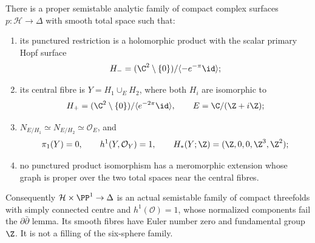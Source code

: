 \begin{proposition}\label{push:src:B.4.7}
There is a proper semistable analytic family of compact complex
surfaces $p:\mathcal H\to\Delta$ with smooth total space such that:
\begin{enumerate}
\item its punctured restriction is a holomorphic product with the
scalar primary Hopf surface
\[
 H_-=(\C^2\setminus\{0\})/\langle -e^{-\pi}\id\rangle;
\]
\item its central fibre is $Y=H_1\cup_E H_2$, where both $H_i$
are isomorphic to
\[
 H_+=(\C^2\setminus\{0\})/\langle e^{-2\pi}\id\rangle,
 \qquad E=\C/(\Z+i\Z);
\]
\item $N_{E/H_1}\simeq N_{E/H_2}\simeq\mathcal O_E$, and
\[
 \pi_1(Y)=0,\qquad h^1(Y,\mathcal O_Y)=1,
 \qquad H_*(Y;\Z)=(\Z,0,0,\Z^3,\Z^2);
\]
\item no punctured product isomorphism has a meromorphic extension
whose graph is proper over the two total spaces near the central
fibres.
\end{enumerate}
Consequently $\mathcal H\times\PP^1\to\Delta$ is an actual
semistable family of compact threefolds with simply connected centre
and $h^1(\mathcal O)=1$, whose normalized components fail the
$\partial\bar\partial$ lemma.  Its smooth fibres have Euler number
zero and fundamental group $\Z$.  It is not a filling of the
six-sphere family.
\end{proposition}
